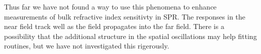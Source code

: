 Thus far we have not found a way to use this phenomena to enhance
measurements of bulk refractive index sensitivty in SPR.  The responses in
the near field track well as the field propagates into the far field.
There is a possibility that the additional structure in the spatial
oscillations may help fitting routines, but we have not investigated this
rigerously.
